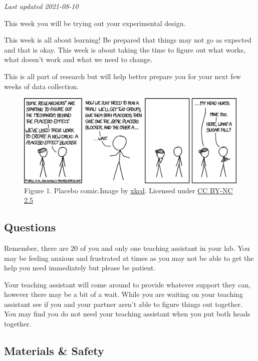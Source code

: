 \documentclass[
]{book}
\begin{document}
\emph{Last updated 2021-08-10}

This week you will be trying out your experimental design.

This week is all about learning! Be prepared that things may not go as expected and that is okay. This week is about taking the time to figure out what works, what doesn't work and what we need to change.

This is all part of research but will help better prepare you for your next few weeks of data collection.

\begin{figure}
\centering
\includegraphics{figures_images/Lab4-Fig1.png}
\caption{Figure 1. Placebo comic.Image by \href{https://xkcd.com/1526/}{xkcd}. Licensed under \href{https://creativecommons.org/licenses/by-nc/2.5/}{CC BY-NC 2.5}}
\end{figure}

\hypertarget{questions}{%
\subsection*{Questions}\label{questions}}

Remember, there are 20 of you and only one teaching assistant in your lab. You may be feeling anxious and frustrated at times as you may not be able to get the help you need immediately but please be patient.

Your teaching assistant will come around to provide whatever support they can, however there may be a bit of a wait. While you are waiting on your teaching assistant see if you and your partner aren't able to figure things out together. You may find you do not need your teaching assistant when you put both heads together.

\hypertarget{materials-safety}{%
\subsection*{Materials \& Safety}\label{materials-safety}}
\end{document}
